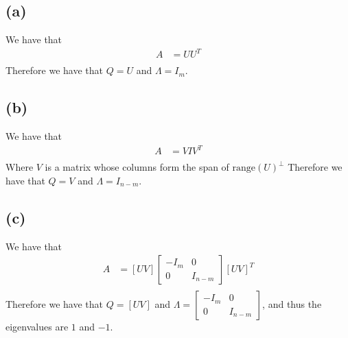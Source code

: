 \documentclass[11pt]{article}
\begin{document}
\subsection*{(a)}
We have that 
\begin{align*}
    A &= UU^T\\
\end{align*}
Therefore we have that $Q=U$ and $\Lambda=I_{m}$.
\subsection*{(b)}
We have that 
\begin{align*}
    A &= V I V^T\\
\end{align*}
Where $V$ is a matrix whose columns form the span of $\text{range}(U)^{\perp}$
Therefore we have that $Q=V$ and $\Lambda=I_{n-m}$.
\subsection*{(c)}
We have that 
\begin{align*}
    A &= [U V] \begin{bmatrix}
        -I_{m} & 0\\
        0 & I_{n-m}
    \end{bmatrix} [U V]^T\\
\end{align*}
Therefore we have that $Q=[U V]$ and $\Lambda=\begin{bmatrix}
    -I_{m} & 0\\
    0 & I_{n-m}
\end{bmatrix}$, and thus the eigenvalues are $1$ and $-1$.
\end{document}
